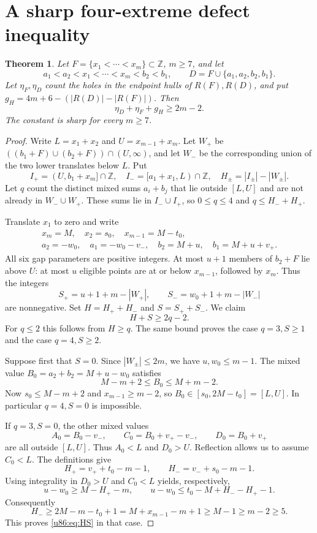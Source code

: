 \documentclass[11pt,a4paper]{article}
\newtheorem{theorem}{Theorem}[section]
\theoremstyle{remark}
\newcommand{\Z}{\mathbb Z}
\begin{document}
\section{A sharp four-extreme defect inequality}\label{u86:sec:sharp}
\begin{theorem}\label{u86:thm:sharp}
Let $F=\{x_1<\cdots<x_m\}\subset\Z$, $m\ge7$, and let
\[
 a_1<a_2<x_1<\cdots<x_m<b_2<b_1,\qquad
 D=F\cup\{a_1,a_2,b_2,b_1\}.
\]
Let $\eta_F,\eta_D$ count the holes in the endpoint hulls of $R(F),R(D)$,
and put $g_H=4m+6-(|R(D)|-|R(F)|)$. Then
\begin{equation}\label{u86:eq:sharp}
 \boxed{\eta_D+\eta_F+g_H\ge2m-2.}
\end{equation}
The constant is sharp for every $m\ge7$.
\end{theorem}
\begin{proof}
Write $L=x_1+x_2$ and $U=x_{m-1}+x_m$. Let $W_+$ be
$((b_1+F)\cup(b_2+F))\cap(U,\infty)$, and let $W_-$ be the corresponding
union of the two lower translates below $L$. Put
\[
 I_+=(U,b_1+x_m]\cap\Z,\quad I_-=[a_1+x_1,L)\cap\Z,
 \quad H_\pm=|I_\pm|-|W_\pm|.
\]
Let $q$ count the distinct mixed sums $a_i+b_j$ that lie outside $[L,U]$
and are not already in $W_-\cup W_+$. These sums lie in $I_-\cup I_+$,
so $0\le q\le4$ and $q\le H_-+H_+$.

Translate $x_1$ to zero and write
\[
\begin{gathered}
 x_m=M,\quad x_2=s_0,\quad x_{m-1}=M-t_0,\\
 a_2=-w_0,\quad a_1=-w_0-v_-,\quad
 b_2=M+u,\quad b_1=M+u+v_+.
\end{gathered}
\]
All six gap parameters are positive integers. At most $u+1$ members of
$b_2+F$ lie above $U$: at most $u$ eligible points are at or below
$x_{m-1}$, followed by $x_m$. Thus the integers
\[
 S_+=u+1+m-|W_+|,\qquad S_-=w_0+1+m-|W_-|
\]
are nonnegative. Set $H=H_++H_-$ and $S=S_++S_-$. We claim
\begin{equation}\label{u86:eq:HS}
 H+S\ge2q-2.
\end{equation}
For $q\le2$ this follows from $H\ge q$. The same bound proves the case
$q=3,S\ge1$ and the case $q=4,S\ge2$.

Suppose first that $S=0$. Since $|W_\pm|\le2m$, we have
$u,w_0\le m-1$. The mixed value $B_0=a_2+b_2=M+u-w_0$ satisfies
\[
 M-m+2\le B_0\le M+m-2.
\]
Now $s_0\le M-m+2$ and $x_{m-1}\ge m-2$, so
$B_0\in[s_0,2M-t_0]=[L,U]$. In particular $q=4,S=0$ is impossible.

If $q=3,S=0$, the other mixed values
\[
 A_0=B_0-v_-,\qquad C_0=B_0+v_+-v_-,\qquad D_0=B_0+v_+
\]
are all outside $[L,U]$. Thus $A_0<L$ and $D_0>U$. Reflection allows us to
assume $C_0<L$. The definitions give
\[
 H_+=v_++t_0-m-1,\qquad H_-=v_-+s_0-m-1.
\]
Using integrality in $D_0>U$ and $C_0<L$ yields, respectively,
\[
 u-w_0\ge M-H_+-m,\qquad
 u-w_0\le t_0-M+H_--H_+-1.
\]
Consequently
\[
 H_-\ge2M-m-t_0+1=M+x_{m-1}-m+1\ge M-1\ge m-2\ge5.
\]
This proves \eqref{u86:eq:HS} in that case.


\end{proof}
\end{document}
